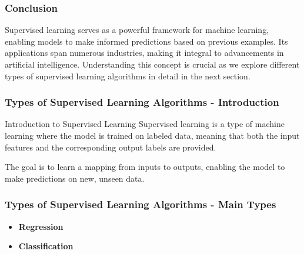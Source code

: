 \documentclass{beamer}
\begin{document}
\begin{frame}[fragile]
    \frametitle{Conclusion}
    Supervised learning serves as a powerful framework for machine learning, enabling models to make informed predictions based on previous examples. Its applications span numerous industries, making it integral to advancements in artificial intelligence. Understanding this concept is crucial as we explore different types of supervised learning algorithms in detail in the next section.
\end{frame}

\begin{frame}[fragile]
    \frametitle{Types of Supervised Learning Algorithms - Introduction}
    \begin{block}{Introduction to Supervised Learning}
        Supervised learning is a type of machine learning where the model is trained on labeled data, meaning that both the input features and the corresponding output labels are provided. 
    \end{block}
    The goal is to learn a mapping from inputs to outputs, enabling the model to make predictions on new, unseen data.
\end{frame}

\begin{frame}[fragile]
    \frametitle{Types of Supervised Learning Algorithms - Main Types}
    \begin{itemize}
        \item \textbf{Regression}
        \item \textbf{Classification}
    \end{itemize}
\end{frame}
\end{document}
